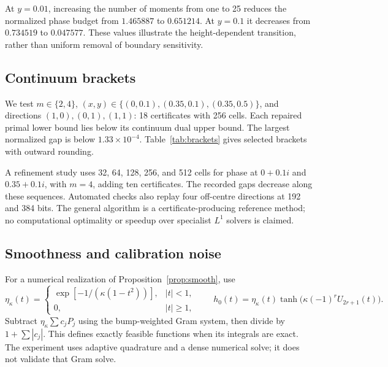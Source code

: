 \documentclass[11pt]{article}
\theoremstyle{remark}\newtheorem{remark}[theorem]{Remark}
\newcommand{\C}{\mathcal C}
\newcommand{\Real}{\operatorname{Re}}
\newcommand{\Imag}{\operatorname{Im}}
\begin{document}
At $y=0.01$, increasing the number of moments from one to 25 reduces the
normalized phase budget from $1.465887$ to $0.651214$.
At $y=0.1$ it decreases from $0.734519$ to $0.047577$.
These values illustrate the height-dependent transition, rather than uniform
removal of boundary sensitivity.

\subsection{Continuum brackets}
We test $m\in\{2,4\}$,
$(x,y)\in\{(0,0.1),(0.35,0.1),(0.35,0.5)\}$, and directions
$(1,0),(0,1),(1,1)$: 18 certificates with 256 cells.
Each repaired primal lower bound lies below its continuum dual upper bound.
The largest normalized gap is below $1.33\times10^{-4}$.
Table~\ref{tab:brackets} gives selected brackets with outward rounding.

\begin{table}[t]
\centering
\caption{Continuum support brackets for a unit envelope.
Direction $(u,v)$ means $u\Real\C h+v\Imag\C h$;
$(1,1)$ is not a unit direction.
Centre phase values agree with the closed laws.}
\label{tab:brackets}
\end{table}

A refinement study uses 32, 64, 128, 256, and 512 cells for phase at
$0+0.1i$ and $0.35+0.1i$, with $m=4$, adding ten certificates.
The recorded gaps decrease along these sequences.
Automated checks also replay four off-centre directions at 192 and 384 bits.
The general algorithm is a certificate-producing reference method; no
computational optimality or speedup over specialist $L^1$ solvers is claimed.

\subsection{Smoothness and calibration noise}
For a numerical realization of Proposition~\ref{prop:smooth}, use
\[
 \eta_\kappa(t)=
 \begin{cases}
 \exp[-1/(\kappa(1-t^2))],& |t|<1,\\
 0,& |t|\geq1,
 \end{cases}
 \qquad
 h_0(t)=\eta_\kappa(t)\tanh\!\big(\kappa(-1)^rU_{2r+1}(t)\big).
\]
Subtract $\eta_\kappa\sum c_jP_j$ using the bump-weighted Gram system,
then divide by $1+\sum|c_j|$.
This defines exactly feasible functions when its integrals are exact.
The experiment uses adaptive quadrature and a dense numerical solve;
it does not validate that Gram solve.
\end{document}
